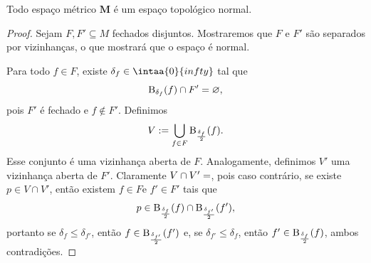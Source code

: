 \begin{prop}
Todo espaço métrico $\bm M$ é um espaço topológico normal.
\end{prop}
\begin{proof}
Sejam $F,F' \subseteq M$ fechados disjuntos. Mostraremos que $F$ e $F'$ são
separados por vizinhanças, o que mostrará que o espaço é normal.

Para todo $f \in F$, existe $\delta_f \in \intaa{0}{infty}$ tal que
	\begin{equation*}
	\mathrm{B}_{\delta_f}(f) \cap F' = \varnothing,
	\end{equation*}
pois $F'$ é fechado e $f \notin F'$. Definimos
	\begin{equation*}
	V := \bigcup_{f \in F} \mathrm{B}_{\frac{\delta_f}{2}}(f).
	\end{equation*}
Esse conjunto é uma vizinhança aberta de $F$. Analogamente, definimos $V'$ uma vizinhança aberta de $F'$. Claramente $V \cap V'=\empty$, pois caso contrário, se existe $p \in V \cap V'$, então existem $f \in F$e $f' \in F'$ tais que
	\begin{equation*}
	p \in \mathrm{B}_{\frac{\delta_f}{2}}(f) \cap \mathrm{B}_{\frac{\delta_{f'}}{2}}(f'),
	\end{equation*}
portanto se $\delta_f \leq \delta_{f'}$, então $f \in \mathrm{B}_{\frac{\delta_{f'}}{2}}(f')$ e, se $\delta_{f'} \leq \delta_f$, então $f' \in \mathrm{B}_{\frac{\delta_f}{2}}(f)$, ambos contradições.
%
\end{proof}

